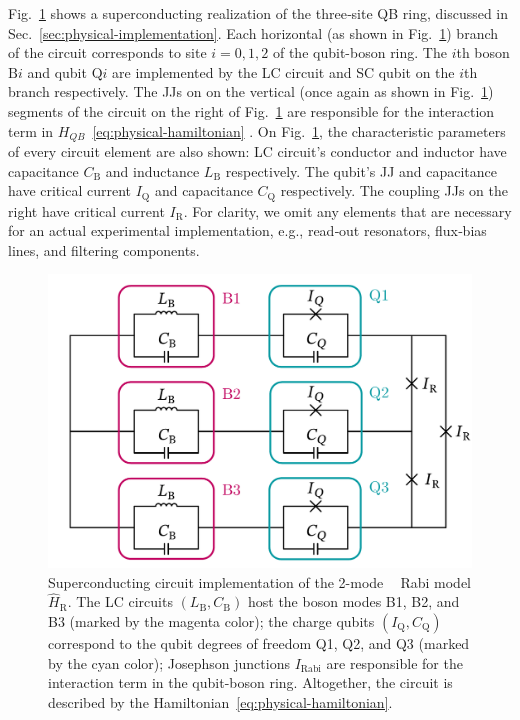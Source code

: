 \documentclass[reprint, aps, prx, amsmath, amssymb, longbibliography, superscriptaddress]{revtex4-2}
\DeclareMathOperator{\Zthree}{\mathbb{Z}_3}
\begin{document}
Fig.~\ref{fig:superconducting-Rabi} shows a superconducting realization of the three‑site QB ring, discussed in Sec.~\ref{sec:physical-implementation}. Each horizontal (as shown in Fig.~\ref{fig:superconducting-Rabi}) branch of the circuit corresponds to site $i = 0,1,2$ of the qubit-boson ring. The $i$th boson $\mathrm{B}i$ and qubit $\mathrm{Q}i$ are implemented by the LC circuit and SC qubit on the $i$th branch respectively. The JJs on on the vertical (once again as shown in Fig.~\ref{fig:superconducting-Rabi}) segments of the circuit on the right of Fig.~\ref{fig:superconducting-Rabi} are responsible for the interaction term in $H_{QB}$~\eqref{eq:physical-hamiltonian} \cite{siewert_aspects_2000,rasmussen_controllable_2019,shafranjuk_twoqubit_2006,allman_tunable_2014,hu_controllable_2007}. On Fig.~\ref{fig:superconducting-Rabi}, the characteristic parameters of every circuit element are also shown: LC circuit's conductor and inductor have capacitance $C_{\text{B}}$ and inductance $L_{\text{B}}$ respectively. The qubit's JJ and capacitance have critical current $I_{\text{Q}}$ and capacitance $C_{\text{Q}}$ respectively. The coupling JJs on the right have critical current $I_{\text{R}}$. For clarity, we omit any elements that are necessary for an actual experimental implementation, e.g., read‑out resonators, flux‑bias lines, and filtering components.

\begin{figure}[t]
  \includegraphics[width=\linewidth]{pics/SC_Rabi_circuit_with_contours.pdf}
  \caption{Superconducting circuit implementation of the 2-mode $\Zthree$ Rabi model $\hat H_{\text{R}}$. The LC circuits $(L_{\text{B}}, C_{\text{B}})$ host the boson modes B1, B2, and B3 (marked by the magenta color); the charge qubits $(I_{\text{Q}}, C_{\text{Q}})$ correspond to the qubit degrees of freedom Q1, Q2, and Q3 (marked by the cyan color); Josephson junctions $I_{\text{Rabi}}$ are responsible for the interaction term in the qubit-boson ring. Altogether, the circuit is described by the Hamiltonian~\eqref{eq:physical-hamiltonian}.}
  \label{fig:superconducting-Rabi}
\end{figure}
\end{document}
